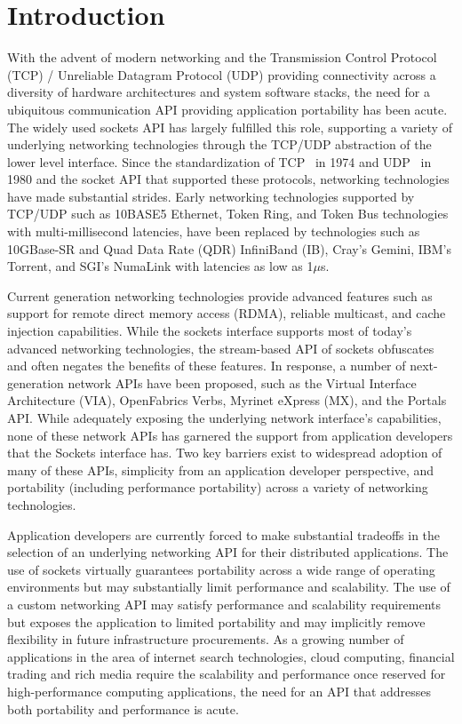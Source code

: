 \section{Introduction}
\label{sec:introduction}

With the advent of modern networking and the Transmission Control
Protocol (TCP) / Unreliable Datagram Protocol (UDP) providing
connectivity across a diversity of hardware architectures and system
software stacks, the need for a ubiquitous communication API providing
application portability has been acute. The widely used sockets API
has largely fulfilled this role, supporting a variety of underlying
networking technologies through the TCP/UDP abstraction of the lower
level interface. Since the standardization of TCP~\cite{tcp-rfc-675}
in 1974 and UDP~\cite{udp-rfc-768} in 1980 and the socket API that
supported these protocols, networking technologies have made
substantial strides. Early networking technologies supported by
TCP/UDP such as 10BASE5 Ethernet, Token Ring, and Token Bus
technologies with multi-millisecond latencies, have been replaced by
technologies such as 10GBase-SR and Quad Data Rate (QDR) InfiniBand
(IB), Cray's Gemini, IBM's Torrent, and SGI's NumaLink with latencies
as low as 1$\mu$s.

Current generation networking technologies provide advanced features
such as support for remote direct memory access (RDMA), reliable
multicast, and cache injection capabilities. While the sockets
interface supports most of today's advanced networking technologies,
the stream-based API of sockets obfuscates and often negates the
benefits of these features. In response, a number of next-generation
network APIs have been proposed, such as the Virtual Interface
Architecture (VIA), OpenFabrics Verbs, Myrinet eXpress (MX), and the
Portals API. While adequately exposing the underlying network
interface's capabilities, none of these network APIs has garnered the
support from application developers that the Sockets interface has. Two
key barriers exist to widespread adoption of many of these APIs,
simplicity from an application developer perspective, and portability
(including performance portability) across a variety of networking
technologies.

Application developers are currently forced to make substantial
tradeoffs in the selection of an underlying networking API for their
distributed applications. The use of sockets virtually guarantees
portability across a wide range of operating environments but may
substantially limit performance and scalability. The use of a custom
networking API may satisfy performance and scalability requirements
but exposes the application to limited portability and may implicitly
remove flexibility in future infrastructure procurements. As a growing
number of applications in the area of internet search technologies,
cloud computing, financial trading and rich media require the
scalability and performance once reserved for high-performance
computing applications, the need for an API that addresses both
portability and performance is acute.

